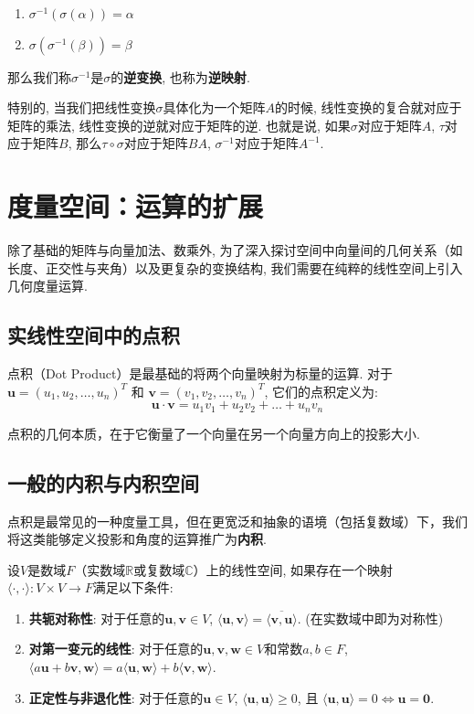 \documentclass{ctexart}
\begin{document}
\begin{enumerate}
    \item $\sigma^{-1}(\sigma(\alpha)) = \alpha$
    \item $\sigma(\sigma^{-1}(\beta)) = \beta$
\end{enumerate}

那么我们称$\sigma^{-1}$是$\sigma$的\textbf{逆变换}, 也称为\textbf{逆映射}.

特别的, 当我们把线性变换$\sigma$具体化为一个矩阵$A$的时候, 线性变换的复合就对应于矩阵的乘法, 线性变换的逆就对应于矩阵的逆. 也就是说, 如果$\sigma$对应于矩阵$A$, $\tau$对应于矩阵$B$, 那么$\tau \circ \sigma$对应于矩阵$BA$, $\sigma^{-1}$对应于矩阵$A^{-1}$.


\section{度量空间：运算的扩展}

除了基础的矩阵与向量加法、数乘外, 为了深入探讨空间中向量间的几何关系（如长度、正交性与夹角）以及更复杂的变换结构, 我们需要在纯粹的线性空间上引入几何度量运算.

\subsection{实线性空间中的点积}

点积（Dot Product）是最基础的将两个向量映射为标量的运算. 
对于 $\mathbf{u} = (u_1, u_2, \ldots, u_n)^T$ 和 $\mathbf{v} = (v_1, v_2, \ldots, v_n)^T$, 它们的点积定义为:
$$ \mathbf{u} \cdot \mathbf{v} = u_1 v_1 + u_2 v_2 + \ldots + u_n v_n $$

点积的几何本质，在于它衡量了一个向量在另一个向量方向上的投影大小.

\subsection{一般的内积与内积空间}

点积是最常见的一种度量工具，但在更宽泛和抽象的语境（包括复数域）下，我们将这类能够定义投影和角度的运算推广为\textbf{内积}. 

设$V$是数域$F$（实数域$\mathbb{R}$或复数域$\mathbb{C}$）上的线性空间, 如果存在一个映射$\langle \cdot, \cdot \rangle: V \times V \to F$满足以下条件:
\begin{enumerate}
    \item \textbf{共轭对称性}: 对于任意的$\mathbf{u}, \mathbf{v} \in V$, $\langle \mathbf{u}, \mathbf{v} \rangle = \overline{\langle \mathbf{v}, \mathbf{u} \rangle}$. (在实数域中即为对称性)
    \item \textbf{对第一变元的线性}: 对于任意的$\mathbf{u}, \mathbf{v}, \mathbf{w} \in V$和常数$a, b \in F$, $\langle a\mathbf{u} + b\mathbf{v}, \mathbf{w} \rangle = a\langle \mathbf{u}, \mathbf{w} \rangle + b\langle \mathbf{v}, \mathbf{w} \rangle$.
    \item \textbf{正定性与非退化性}: 对于任意的$\mathbf{u} \in V$, $\langle \mathbf{u}, \mathbf{u} \rangle \geq 0$, 且 $\langle \mathbf{u}, \mathbf{u} \rangle = 0 \iff \mathbf{u} = \mathbf{0}$.
\end{enumerate}
\end{document}
